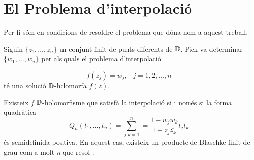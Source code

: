\documentclass[dvipsnames, svgnames, leqno, a4paper, 12pt]{report}
\begin{document}
\section{El Problema d'interpolació}
Per fi sóm en condicions de resoldre el problema que dóna nom a aquest treball.

Siguin $\{z_1,\dots,z_n\}$ un conjunt finit de punts diferents de $\mathbb{D}$. Pick va determinar  $\{w_1,\dots,w_n\}$ per als quals el problema d'interpolació

\begin{equation}\label{eq:interpol}
    f(z_j)=w_j,\, \text{  } j=1,2,\dots,n
\end{equation}
%
té una solució $\mathbb{D}$-holomorfa $f(z)$.

\begin{theorem}[Pick]
    Existeix $f$ $\mathbb{D}$-holomorfisme que satisfà la interpolació \normalfont{(\ref{eq:interpol})} si i només si la forma quadràtica 
    \begin{displaymath}
        Q_n(t_1,\dots,t_n)=\sum_{j,k=1}^n=\frac{1-w_j\overline{w_k}}{1-z_j\overline{z_k}}t_j\overline{t_k}
    \end{displaymath}
    és semidefinida positiva. En aquest cas, existeix un producte de Blaschke finit de grau com a molt $n$ que resol \normalfont{(\ref{eq:interpol})}.
\end{theorem}
\end{document}
